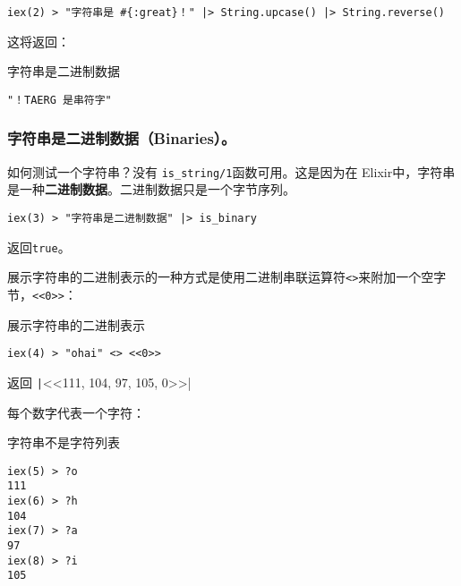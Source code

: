 \begin{code}{}\begin{verbatim}
iex(2) > "字符串是 #{:great}！" |> String.upcase() |> String.reverse()
\end{verbatim}
\end{code}

这将返回：

\begin{code}{字符串是二进制数据}
\begin{verbatim}
"！TAERG 是串符字"
\end{verbatim}
\end{code}


\subsubsection{字符串是二进制数据（Binaries）。}

如何测试一个字符串？没有 \texttt{is\_string/1}函数可用。这是因为在 Elixir中，字符串是一种\textbf{二进制数据}。二进制数据只是一个字节序列。

\begin{code}{}\begin{verbatim}
iex(3) > "字符串是二进制数据" |> is_binary
\end{verbatim}
\end{code}

返回\texttt{true}。

展示字符串的二进制表示的一种方式是使用二进制串联运算符\texttt{<>}来附加一个空字节，\texttt{<<0>>}：

\begin{code}{展示字符串的二进制表示}
\begin{verbatim}
iex(4) > "ohai" <> <<0>>
\end{verbatim}
\label{lst:showing_the_binary_representation_of_a_string}
\end{code}

返回 \texttt|<<111, 104, 97, 105, 0>>|

每个数字代表一个字符：

\begin{code}{字符串不是字符列表}
\begin{verbatim}
iex(5) > ?o
111
iex(6) > ?h
104
iex(7) > ?a
97
iex(8) > ?i
105
\end{verbatim}
\end{code}

